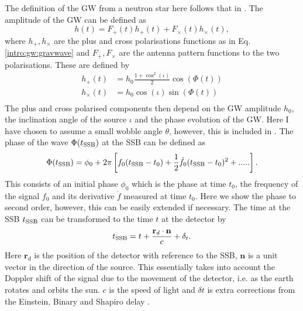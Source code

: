 The definition of the \gls{GW} from a neutron star here follows that in \citep{riles2017RecentSearches,schutz1998DataAnalysis,dupuis2005BayesianEstimation}. The amplitude of the \gls{GW} can be defined as
\begin{equation}
\label{intro:cw:ht}
h(t) = F_+(t)h_{+}(t) +F_{\times}(t)h_{\times}(t),
\end{equation}
where $h_{+},h_{\times}$ are the plus and cross polarisations functions as in Eq.\ref{intro:gw:gravwave} and $F_{+},F_{\times}$ are the antenna pattern functions to the two polarisations.
These are defined by
\begin{equation}
\label{intro:cw:amplitudes}
    \begin{split}
        h_{+}(t) &=  h_0 \frac{1 + \cos^2{(\iota)}}{2}\cos{\left(\Phi(t)\right)} \\
        h_{\times}(t) &= h_0  \cos{(\iota)} \sin{\left( \Phi(t)\right) } \\
    \end{split}
\end{equation}
The plus and cross polarised components then depend on the \gls{GW} amplitude $h_0$, the inclination angle of the source $\iota$ and the phase evolution of the \gls{GW}. Here I have chosen to assume a small wobble angle $\theta$, however, this is included in \citep{schutz1998DataAnalysis}. The phase of the wave $\Phi(t_{{\rm SSB}})$ at the \gls{SSB} can be defined as
\begin{equation}
\label{searchcw:model:phase}
    \Phi(t_{{\rm SSB}}) = \phi_0 + 2\pi\left[ f_0(t_{{\rm SSB}} - t_0) + \frac{1}{2} \dot{f_0} (t_{{\rm SSB}} - t_0)^2 + .....\right] .
\end{equation}
This consists of an initial phase $\phi_0$ which is the phase at time $t_0$, the frequency of the signal $f_0$ and its derivative ${\dot{f}}$ measured at time $t_0$. Here we show the phase to second order, however, this can be easily extended if necessary. 
The time at the \gls{SSB} $t_{{\rm SSB}}$ can be transformed to the time $t$ at the detector by
\begin{equation}
	\label{searchcw:model:ssbtime}
t_{{\rm SSB}} = t + \frac{\mathbf{r}_d \cdot \mathbf{n}}{c} + \delta_t.
\end{equation}
Here $\mathbf{r}_d$ is the position of the detector with reference to the \gls{SSB}, $\mathbf{n}$ is a unit vector in the direction of the source. This essentially takes into account the Doppler shift of the signal due to the movement of the detector, i.e. as the earth rotates and orbits the sun. $c$ is the speed of light and $\delta t$ is extra corrections from the Einstein, Binary and Shapiro delay \citep{}.

